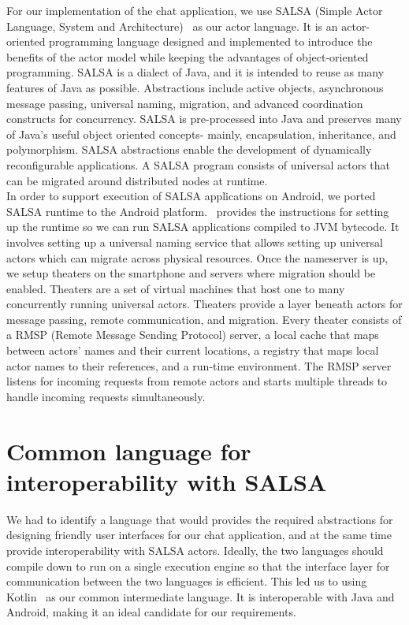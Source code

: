 \documentclass[a4paper]{article}
\begin{document}
For our implementation of the chat application, we use SALSA (Simple Actor Language, System and Architecture)~\cite{Varela:2001:PDR:583960.583964} as our actor language. It is an actor-oriented programming language designed and implemented to introduce the benefits of the actor model while keeping the advantages of object-oriented programming. SALSA is a dialect of Java, and it is intended to reuse as many features of Java as possible. Abstractions include active objects, asynchronous message passing, universal naming, migration, and advanced coordination constructs for concurrency. SALSA is pre-processed into Java and preserves many of Java’s useful object oriented concepts- mainly, encapsulation, inheritance, and polymorphism. SALSA abstractions enable the development of dynamically reconfigurable applications. A SALSA program consists of universal actors that can be migrated around distributed nodes at runtime.\\ 

In order to support execution of SALSA applications on Android, we ported SALSA runtime to the Android platform.~\cite{salsaandroid} provides the instructions for setting up the runtime so we can run SALSA applications compiled to JVM bytecode. It involves setting up a universal naming service that allows setting up universal actors which can migrate across physical resources. Once the nameserver is up, we setup theaters on the smartphone and servers where migration should be enabled. Theaters are a set of virtual machines that host one to many concurrently running universal actors. Theaters provide a layer beneath actors for message passing, remote communication, and migration. Every theater consists of a RMSP (Remote Message Sending Protocol) server, a local cache that maps between actors’ names and their  current locations, a registry that maps local actor names to their references, and a run-time environment. The RMSP server listens for incoming requests from remote actors and starts multiple threads to handle incoming requests simultaneously.


\section{Common language for interoperability with SALSA}
We had to identify a language that would provides the required abstractions for designing friendly user interfaces for our chat application, and at the same time provide interoperability with SALSA actors. Ideally, the two languages should compile down to run on a single execution engine so that the interface layer for communication between the two languages is efficient. This led us to using Kotlin~\cite{kotlin} as our common intermediate language. It is interoperable with Java and Android, making it an ideal candidate for our requirements.\\
\end{document}
